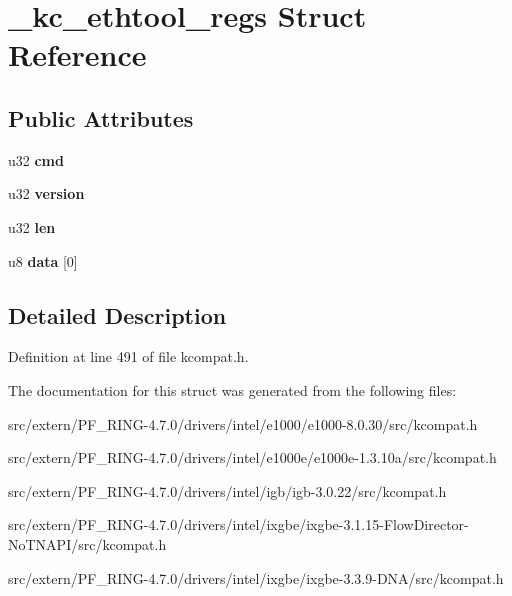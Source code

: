 \hypertarget{struct__kc__ethtool__regs}{
\section{\_\-kc\_\-ethtool\_\-regs Struct Reference}
\label{struct__kc__ethtool__regs}
}
\subsection*{Public Attributes}
\begin{DoxyCompactItemize}
\item 
\hypertarget{struct__kc__ethtool__regs_a41dfc65de04e09d04651ffad479bb2ff}{
u32 {\bfseries cmd}}
\label{struct__kc__ethtool__regs_a41dfc65de04e09d04651ffad479bb2ff}

\item 
\hypertarget{struct__kc__ethtool__regs_acaf1c4595006708039d3191aa69b99ce}{
u32 {\bfseries version}}
\label{struct__kc__ethtool__regs_acaf1c4595006708039d3191aa69b99ce}

\item 
\hypertarget{struct__kc__ethtool__regs_a8a9aa0dfaa78544b03a4935f90a74c70}{
u32 {\bfseries len}}
\label{struct__kc__ethtool__regs_a8a9aa0dfaa78544b03a4935f90a74c70}

\item 
\hypertarget{struct__kc__ethtool__regs_ae92dbf7eeca3043529d2e56e9ad12b85}{
u8 {\bfseries data} \mbox{[}0\mbox{]}}
\label{struct__kc__ethtool__regs_ae92dbf7eeca3043529d2e56e9ad12b85}

\end{DoxyCompactItemize}


\subsection{Detailed Description}


Definition at line 491 of file kcompat.h.



The documentation for this struct was generated from the following files:\begin{DoxyCompactItemize}
\item 
src/extern/PF\_\-RING-\/4.7.0/drivers/intel/e1000/e1000-\/8.0.30/src/kcompat.h\item 
src/extern/PF\_\-RING-\/4.7.0/drivers/intel/e1000e/e1000e-\/1.3.10a/src/kcompat.h\item 
src/extern/PF\_\-RING-\/4.7.0/drivers/intel/igb/igb-\/3.0.22/src/kcompat.h\item 
src/extern/PF\_\-RING-\/4.7.0/drivers/intel/ixgbe/ixgbe-\/3.1.15-\/FlowDirector-\/NoTNAPI/src/kcompat.h\item 
src/extern/PF\_\-RING-\/4.7.0/drivers/intel/ixgbe/ixgbe-\/3.3.9-\/DNA/src/kcompat.h\end{DoxyCompactItemize}
